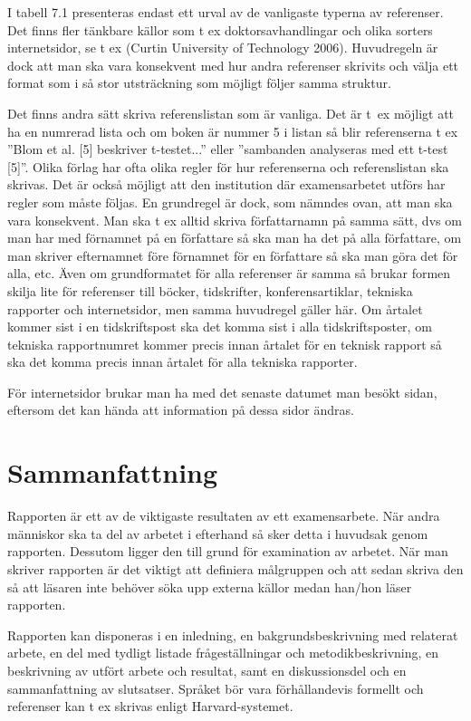 I tabell 7.1 presenteras endast ett urval av de vanligaste typerna av
referenser. Det finns fler tänkbare källor som t ex doktorsavhandlingar
och olika sorters internetsidor, se t ex (Curtin University of
Technology 2006). Huvudregeln är dock att man ska vara konsekvent med
hur andra referenser skrivits och välja ett format som i så stor
utsträckning som möjligt följer samma struktur.

Det finns andra sätt skriva referenslistan som är vanliga. Det är t~ex
möjligt att ha en numrerad lista och om boken är nummer 5 i listan så
blir referenserna t ex ''Blom et al. {[}5{]} beskriver t-testet...''
eller ''sambanden analyseras med ett t-test {[}5{]}''. Olika förlag har
ofta olika regler för hur referenserna och referenslistan ska skrivas.
Det är också möjligt att den institution där examensarbetet utförs har
regler som måste följas. En grundregel är dock, som nämndes ovan, att
man ska vara konsekvent. Man ska t ex alltid skriva författarnamn på
samma sätt, dvs om man har med förnamnet på en författare så ska man ha
det på alla författare, om man skriver efternamnet före förnamnet för en
författare så ska man göra det för alla, etc. Även om grundformatet för
alla referenser är samma så brukar formen skilja lite för referenser
till böcker, tidskrifter, konferensartiklar, tekniska rapporter och
internetsidor, men samma huvudregel gäller här. Om årtalet kommer sist i
en tidskriftspost ska det komma sist i alla tidskriftsposter, om
tekniska rapportnumret kommer precis innan årtalet för en teknisk
rapport så ska det komma precis innan årtalet för alla tekniska
rapporter.

För internetsidor brukar man ha med det senaste datumet man besökt
sidan, eftersom det kan hända att information på dessa sidor ändras.

\section{Sammanfattning}\label{sammanfattning}

Rapporten är ett av de viktigaste resultaten av ett examensarbete. När
andra människor ska ta del av arbetet i efterhand så sker detta i
huvudsak genom rapporten. Dessutom ligger den till grund för examination
av arbetet. När man skriver rapporten är det viktigt att definiera
målgruppen och att sedan skriva den så att läsaren inte behöver söka upp
externa källor medan han/hon läser rapporten.

Rapporten kan disponeras i en inledning, en bakgrundsbeskrivning med
relaterat arbete, en del med tydligt listade frågeställningar och
metodikbeskrivning, en beskrivning av utfört arbete och resultat, samt
en diskussionsdel och en sammanfattning av slutsatser. Språket bör vara
förhållandevis formellt och referenser kan t ex skrivas enligt
Harvard-systemet.
